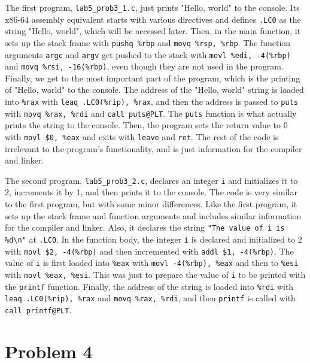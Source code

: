 \documentclass{article}
\begin{document}
\vspace{0.5cm}

The first program, \texttt{lab5\_prob3\_1.c}, just prints "Hello, world" to the console. 
Its x86-64 assembly equivalent starts with various directives and defines \texttt{.LC0} as the string "Hello, world", which will be accessed later.
Then, in the main function, it sets up the stack frame with \texttt{pushq \%rbp} and \texttt{movq \%rsp, \%rbp}.
The function arguments \texttt{argc} and \texttt{argv} get pushed to the stack with \texttt{movl \%edi, -4(\%rbp)} and \texttt{movq \%rsi, -16(\%rbp)},
even though they are not used in the program.
Finally, we get to the most important part of the program, which is the printing of "Hello, world" to the console.
The address of the "Hello, world" string is loaded into \texttt{\%rax} with \texttt{leaq .LC0(\%rip), \%rax}, and then the address is passed to \texttt{puts} with \texttt{movq \%rax, \%rdi} and \texttt{call puts@PLT}.
The \texttt{puts} function is what actually prints the string to the console.
Then, the program sets the return value to 0 with \texttt{movl \$0, \%eax} and exits with \texttt{leave} and \texttt{ret}.
The rest of the code is irrelevant to the program's functionality, and is just information for the compiler and linker.

The second program, \texttt{lab5\_prob3\_2.c}, declares an integer \texttt{i} and initializes it to 2, increments it by 1, and then prints it to the console.
The code is very similar to the first program, but with some minor differences.
Like the first program, it sets up the stack frame and function arguments and includes similar information for the compiler and linker.
Also, it declares the string \texttt{"The value of i is \%d\textbackslash n"} at \texttt{.LC0}.
In the function body, the integer \texttt{i} is declared and initialized to 2 with \texttt{movl \$2, -4(\%rbp)}
and then incremented with \texttt{addl \$1, -4(\%rbp)}.
The value of \texttt{i} is first loaded into \texttt{\%eax} with \texttt{movl -4(\%rbp), \%eax} and then to \texttt{\%esi} with \texttt{movl \%eax, \%esi}.
This was just to prepare the value of \texttt{i} to be printed with the \texttt{printf} function.
Finally, the address of the string is loaded into \texttt{\%rdi} with \texttt{leaq .LC0(\%rip), \%rax} and \texttt{movq \%rax, \%rdi}, and then \texttt{printf} is called with \texttt{call printf@PLT}.

\section*{Problem 4}
\end{document}
